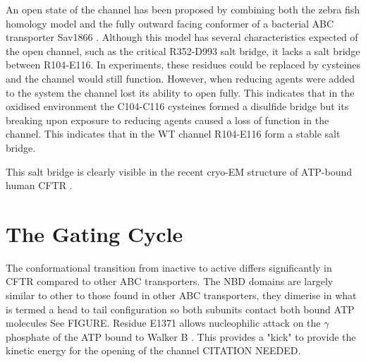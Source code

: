 An open state of the channel has been proposed by combining both the zebra fish homology model and the fully outward facing conformer of a bacterial ABC transporter Sav1866 \cite{Hoffmann2018}. Although this model has several characteristics expected of the open channel, such as the critical R352-D993 salt bridge, it lacks a salt bridge between R104-E116. In experiments, these residues could be replaced by cysteines and the channel would still function. However, when reducing agents were added to the system the channel lost its ability to open fully. This indicates that in the oxidised environment the C104-C116 cysteines formed a disulfide bridge but its breaking upon exposure to reducing agents caused a loss of function in the channel. This indicates that in the WT channel R104-E116 form a stable salt bridge. 

This salt bridge is clearly visible in the recent cryo-EM structure of ATP-bound human CFTR \cite{zhang2018}.

\section{The Gating Cycle}
The conformational transition from inactive to active differs significantly in CFTR compared to other ABC transporters. The NBD domains are largely similar to other to those found in other ABC transporters, they dimerise in what is termed a head to tail configuration so both subunits contact both bound ATP molecules \cite{} See FIGURE. Residue E1371 allows nucleophilic attack on the $\gamma$ phosphate of the ATP bound to Walker B \cite{Stratford2007}. This provides a "kick" to provide the kinetic energy for the opening of the channel CITATION NEEDED. 

